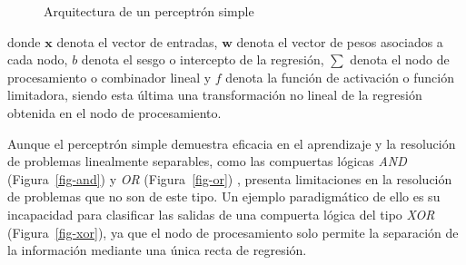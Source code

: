 \documentclass[
  us-letterpaper,
]{scrreprt}
\theoremstyle{plain}
\theoremstyle{definition}
\theoremstyle{definition}
\theoremstyle{plain}
\theoremstyle{remark}
\begin{document}
\begin{figure}


\caption{\label{fig-arqper}Arquitectura de un perceptrón simple}

\end{figure}%

donde \(\mathbf x\) denota el vector de entradas, \(\mathbf w\) denota
el vector de pesos asociados a cada nodo, \(b\) denota el sesgo o
intercepto de la regresión, \(\sum\) denota el nodo de procesamiento o
combinador lineal y \(f\) denota la función de activación o función
limitadora, siendo esta última una transformación no lineal de la
regresión obtenida en el nodo de procesamiento.

Aunque el perceptrón simple demuestra eficacia en el aprendizaje y la
resolución de problemas linealmente separables, como las compuertas
lógicas \emph{AND} (Figura~\ref{fig-and}) y \emph{OR}
(Figura~\ref{fig-or}) , presenta limitaciones en la resolución de
problemas que no son de este tipo. Un ejemplo paradigmático de ello es
su incapacidad para clasificar las salidas de una compuerta lógica del
tipo \emph{XOR} (Figura~\ref{fig-xor}), ya que el nodo de procesamiento
solo permite la separación de la información mediante una única recta de
regresión.
\end{document}
